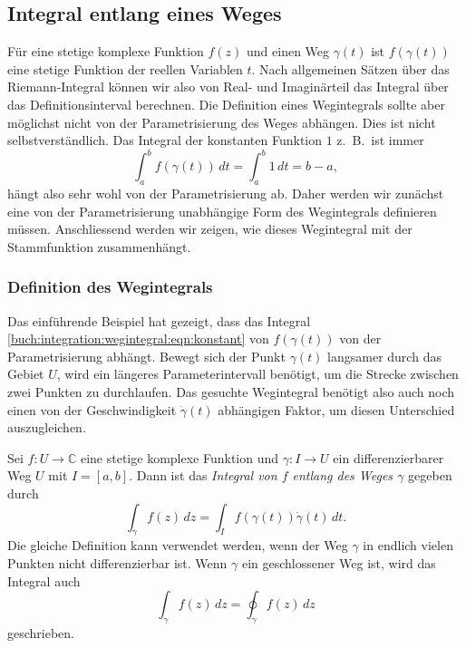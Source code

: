 %
%
%
\subsection{Integral entlang eines Weges}
Für eine stetige komplexe Funktion $f(z)$ und einen Weg $\gamma(t)$
ist $f(\gamma(t))$ eine stetige Funktion der reellen Variablen $t$.
Nach allgemeinen Sätzen über das Riemann-Integral können wir also 
%
von Real- und Imaginärteil das Integral über das Definitionsinterval
berechnen.
Die Definition eines Wegintegrals sollte aber möglichst nicht von
der Parametrisierung des Weges abhängen.
Dies ist nicht selbstverständlich.
Das Integral der konstanten Funktion $1$ z.~B.~ist immer
\begin{equation}
\int_a^b f(\gamma(t)) \,dt
=
\int_a^b 1\,dt
=
b-a,
\label{buch:integration:wegintegral:eqn:konstant}
\end{equation}
hängt also sehr wohl von der Parametrisierung ab.
Daher werden wir zunächst eine von der Parametrisierung unabhängige
Form des Wegintegrals definieren müssen.
Anschliessend werden wir zeigen, wie dieses Wegintegral mit der
Stammfunktion zusammenhängt.

%
%
\subsubsection{Definition des Wegintegrals}
Das einführende Beispiel
hat gezeigt, dass das Integral
\eqref{buch:integration:wegintegral:eqn:konstant}
von $f(\gamma(t))$ von der Parametrisierung
abhängt.
Bewegt sich der Punkt $\gamma(t)$ langsamer durch das Gebiet $U$,
wird ein längeres Parameterintervall benötigt, um die Strecke
zwischen zwei Punkten zu durchlaufen.
Das gesuchte Wegintegral benötigt also auch noch einen
von der Geschwindigkeit $\dot{\gamma}(t)$ abhängigen Faktor,
um diesen Unterschied auszugleichen.

\begin{definition}
\label{buch:integration:definition:definition:wegintegral}
Sei $f\colon U\to\mathbb{C}$ eine stetige komplexe Funktion und
$\gamma:I\to U$ ein differenzierbarer Weg $U$ mit $I=[a,b]$.
Dann ist das \emph{Integral von $f$ entlang des Weges $\gamma$}
%
%
%
gegeben durch
\begin{equation}
\int_\gamma f(z)\,dz
=
\int_I f(\gamma(t)) \dot{\gamma}(t)\,dt.
\end{equation}
Die gleiche Definition kann verwendet werden, wenn der Weg
$\gamma$ in endlich vielen Punkten nicht differenzierbar ist.
Wenn $\gamma$ ein geschlossener Weg ist, wird das Integral auch
\[
\int_\gamma f(z)\,dz
=
\oint_\gamma f(z)\,dz
\]
geschrieben.
%
\end{definition}

